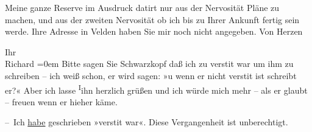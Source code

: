 \pstart
           Meine ganze Reserve im Ausdruck datirt nur aus der Nervosi{\pb}tät Pläne zu machen, und aus der
                  zweiten\strikeout{,} Nervosität ob ich bis zu Ihrer Ankunft
                  fertig sein werde. Ihre
               Adresse in Velden haben Sie mir noch nicht
               angegeben. Von Herzen\pend
           
\pstart
           Ihr{\\[\baselineskip]}\spacefill\mbox{Richard}\pend
           \leftskip=0em{}
\pstart
           \noindent{}Bitte sagen Sie Schwarzkopf daß ich zu
                     versti{\geminationm}t war um ihm zu schreiben – ich weiß schon,
                  er wird sagen: »u wenn er nicht {\pb}versti{\geminationm}t ist schreibt er?« Aber ich lasse \substVorne{}\textsuperscript{I}\substDazwischen{}i\substHinten{}hn herzlich grüßen und ich würde mich mehr – als er glaubt – freuen wenn
                  er hieher käme.\pend
           
\pstart
           – Ich \uline{habe} geschrieben »versti{\geminationm}t war«. Diese Vergangenheit ist unberechtigt.\pend
           \endnumbering{}  
      